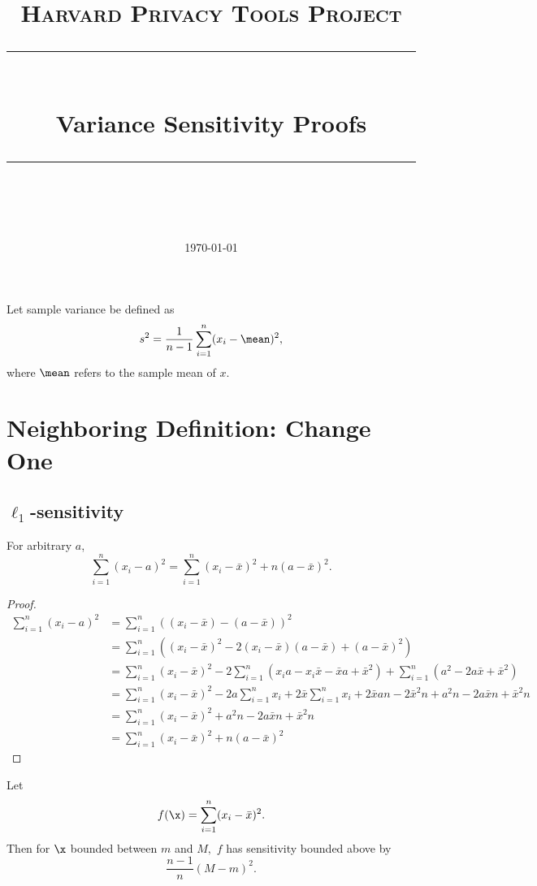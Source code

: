 \documentclass[11pt]{scrartcl} %
\title{
	\normalfont\normalsize
	\textsc{Harvard Privacy Tools Project}\\ %
	\vspace{25pt} %
	\rule{\linewidth}{0.5pt}\\ %
	\vspace{20pt} %
	{\huge Variance Sensitivity Proofs}\\ %
	\vspace{12pt} %
	\rule{\linewidth}{2pt}\\ %
	\vspace{12pt} %
}
\date{\normalsize\today} %
\begin{document}
\maketitle

\begin{definition}
Let sample variance be defined as
$$ s^2 = \frac{1}{n-1} \sum_{i=1}^n (x_i - \mean)^2,$$
where $\mean$ refers to the sample mean of $x$.
\end{definition}

\section{Neighboring Definition: Change One}
\subsection{$\ell_1$-sensitivity}
\begin{lemma}
\label{lemma:meansum}
For arbitrary $a$,
$$ \sum_{i=1}^n (x_i - a)^2 = \sum_{i=1}^n (x_i - \bar{x})^2 + n(a-\bar{x})^2.$$
\end{lemma}

\begin{proof}
\begin{align*}
\sum_{i=1}^n (x_i - a)^2 &= \sum_{i=1}^n \left( (x_i - \bar{x}) - (a-\bar{x}) \right)^2\\
	&= \sum_{i=1}^n \left( (x_i - \bar{x})^2 -2(x_i - \bar{x})(a-\bar{x}) + (a-\bar{x})^2\right)\\
	&= \sum_{i=1}^n (x_i - \bar{x})^2 - 2\sum_{i=1}^n \left(x_ia-x_i\bar{x} -\bar{x}a + \bar{x}^2\right) + \sum_{i=1}^n \left( a^2 -2a\bar{x} + \bar{x}^2\right)\\
	&=  \sum_{i=1}^n (x_i - \bar{x})^2 -2a\sum_{i=1}^n x_i + 2\bar{x}\sum_{i=1}^n x_i + 2\bar{x}an - 2\bar{x}^2n + a^2n-2a\bar{x}n+\bar{x}^2n\\
	&=  \sum_{i=1}^n (x_i - \bar{x})^2 + a^2n-2a\bar{x}n+\bar{x}^2n\\
	&=  \sum_{i=1}^n (x_i - \bar{x})^2 + n(a-\bar{x})^2
\end{align*}

\end{proof}

\begin{theorem}
Let
$$ f(\x) = \sum_{i=1}^n (x_i - \bar{x})^2.$$
Then for $\x$ bounded between $m$ and $M,$ $f$ has sensitivity bounded above by
$$\frac{n-1}{n} (M-m)^2.$$
\end{theorem}
\end{document}
